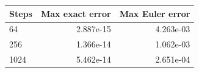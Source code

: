 \begin{tabular}{lrr}\toprule
Steps & Max exact error & Max Euler error \\\midrule
64 & 2.887e-15 & 4.263e-03 \\
256 & 1.366e-14 & 1.062e-03 \\
1024 & 5.462e-14 & 2.651e-04 \\
\bottomrule\end{tabular}
